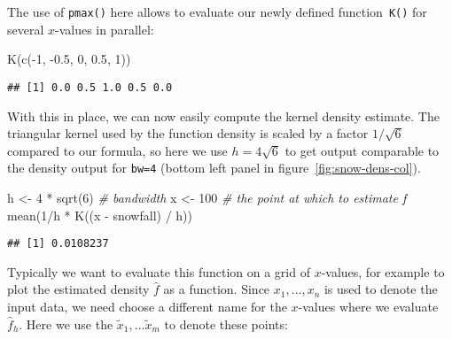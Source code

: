 \documentclass[
  a4paper,
]{article}
\newenvironment{Shaded}{\begin{snugshade}}{\end{snugshade}}
\newcommand{\CommentTok}[1]{\textcolor[rgb]{0.56,0.35,0.01}{\textit{#1}}}
\newcommand{\DecValTok}[1]{\textcolor[rgb]{0.00,0.00,0.81}{#1}}
\newcommand{\FloatTok}[1]{\textcolor[rgb]{0.00,0.00,0.81}{#1}}
\newcommand{\FunctionTok}[1]{\textcolor[rgb]{0.00,0.00,0.00}{#1}}
\newcommand{\NormalTok}[1]{#1}
\newcommand{\OtherTok}[1]{\textcolor[rgb]{0.56,0.35,0.01}{#1}}
\newcommand{\SpecialCharTok}[1]{\textcolor[rgb]{0.00,0.00,0.00}{#1}}
\theoremstyle{definition}
\theoremstyle{definition}
\theoremstyle{definition}
\theoremstyle{definition}
\theoremstyle{remark}
\begin{document}
The use of \texttt{pmax()} here allows to evaluate our newly defined function~\texttt{K()}
for several \(x\)-values in parallel:

\begin{Shaded}
\begin{Highlighting}[]
\FunctionTok{K}\NormalTok{(}\FunctionTok{c}\NormalTok{(}\SpecialCharTok{{-}}\DecValTok{1}\NormalTok{, }\SpecialCharTok{{-}}\FloatTok{0.5}\NormalTok{, }\DecValTok{0}\NormalTok{, }\FloatTok{0.5}\NormalTok{, }\DecValTok{1}\NormalTok{))}
\end{Highlighting}
\end{Shaded}

\begin{verbatim}
## [1] 0.0 0.5 1.0 0.5 0.0
\end{verbatim}

With this in place, we can now easily compute the kernel density estimate.
The triangular kernel used by the function density is scaled by a factor
\(1/\sqrt{6}\) compared to our formula, so here we use \(h = 4\sqrt{6}\)
to get output comparable to the density output for \texttt{bw=4} (bottom left
panel in figure~\ref{fig:snow-dens-col}).

\begin{Shaded}
\begin{Highlighting}[]
\NormalTok{h }\OtherTok{\textless{}{-}} \DecValTok{4} \SpecialCharTok{*} \FunctionTok{sqrt}\NormalTok{(}\DecValTok{6}\NormalTok{) }\CommentTok{\# bandwidth}
\NormalTok{x }\OtherTok{\textless{}{-}} \DecValTok{100} \CommentTok{\# the point at which to estimate f}
\FunctionTok{mean}\NormalTok{(}\DecValTok{1}\SpecialCharTok{/}\NormalTok{h }\SpecialCharTok{*} \FunctionTok{K}\NormalTok{((x }\SpecialCharTok{{-}}\NormalTok{ snowfall) }\SpecialCharTok{/}\NormalTok{ h))}
\end{Highlighting}
\end{Shaded}

\begin{verbatim}
## [1] 0.0108237
\end{verbatim}

Typically we want to evaluate this function on a grid of \(x\)-values,
for example to plot the estimated density \(\hat f\) as a function.
Since \(x_1, \ldots, x_n\) is used to denote the input data, we need
choose a different name for the \(x\)-values where we evaluate \(\hat f_h\).
Here we use the \(\tilde x_1, \ldots \tilde x_m\) to denote these points:
\end{document}
